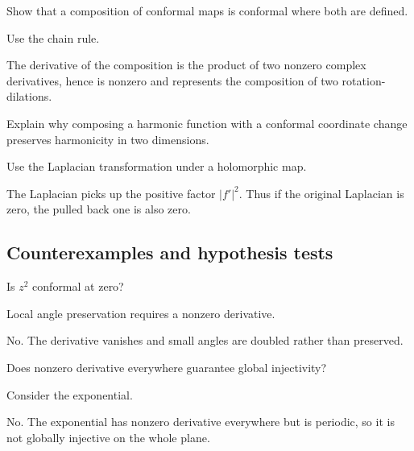 \begin{exercise}[Composition]\label{exr:iv17-expand-08}
Show that a composition of conformal maps is conformal where both are defined.
\end{exercise}
\begin{hint}
Use the chain rule.
\end{hint}
\begin{solution}
The derivative of the composition is the product of two nonzero complex derivatives, hence is nonzero and represents the composition of two rotation-dilations.
\end{solution}

\begin{exercise}\label{exr:iv17-expand-09}
Explain why composing a harmonic function with a conformal coordinate change preserves harmonicity in two dimensions.
\end{exercise}
\begin{hint}
Use the Laplacian transformation under a holomorphic map.
\end{hint}
\begin{solution}
The Laplacian picks up the positive factor \(|f'|^2\). Thus if the original Laplacian is zero, the pulled back one is also zero.
\end{solution}

\subsection*{Counterexamples and hypothesis tests}

\begin{exercise}\label{exr:iv17-expand-10}
Is \(z^2\) conformal at zero?
\end{exercise}
\begin{hint}
Local angle preservation requires a nonzero derivative.
\end{hint}
\begin{solution}
No. The derivative vanishes and small angles are doubled rather than preserved.
\end{solution}

\begin{exercise}\label{exr:iv17-expand-11}
Does nonzero derivative everywhere guarantee global injectivity?
\end{exercise}
\begin{hint}
Consider the exponential.
\end{hint}
\begin{solution}
No. The exponential has nonzero derivative everywhere but is periodic, so it is not globally injective on the whole plane.
\end{solution}


